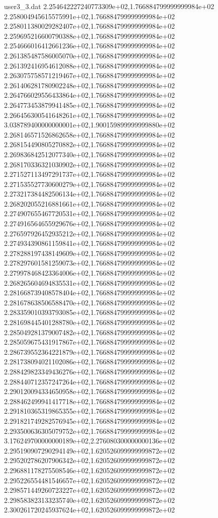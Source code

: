 \begin{filecontents}{user3_3.dat}
2.254642227240773309e+02,1.766884799999999984e+02
2.258004945615575991e+02,1.766884799999999984e+02
2.258011380029282407e+02,1.766884799999999984e+02
2.259695216600790388e+02,1.766884799999999984e+02
2.254666016412661236e+02,1.766884799999999984e+02
2.261385487586005070e+02,1.766884799999999984e+02
2.261392416954612088e+02,1.766884799999999984e+02
2.263075758571219467e+02,1.766884799999999984e+02
2.261406281780902248e+02,1.766884799999999984e+02
2.264766029556433864e+02,1.766884799999999984e+02
2.264773453879941485e+02,1.766884799999999984e+02
2.266456300541648261e+02,1.766884799999999984e+02
3.038789400000000001e+02,1.900159899999999880e+02
2.268146571526862658e+02,1.766884799999999984e+02
2.268154490805270882e+02,1.766884799999999984e+02
2.269836842512077340e+02,1.766884799999999984e+02
2.268170336321030902e+02,1.766884799999999984e+02
2.271527113497291737e+02,1.766884799999999984e+02
2.271535527730600279e+02,1.766884799999999984e+02
2.273217384482506134e+02,1.766884799999999984e+02
2.268202055216881661e+02,1.766884799999999984e+02
2.274907655467720531e+02,1.766884799999999984e+02
2.274916564655929676e+02,1.766884799999999984e+02
2.276597926452935212e+02,1.766884799999999984e+02
2.274934390861159841e+02,1.766884799999999984e+02
2.278288197438149609e+02,1.766884799999999984e+02
2.278297601581259073e+02,1.766884799999999984e+02
2.279978468423364006e+02,1.766884799999999984e+02
2.268265604694835531e+02,1.766884799999999984e+02
2.281668739408578404e+02,1.766884799999999984e+02
2.281678638506588470e+02,1.766884799999999984e+02
2.283359010393793085e+02,1.766884799999999984e+02
2.281698445401288780e+02,1.766884799999999984e+02
2.285049281379007482e+02,1.766884799999999984e+02
2.285059675431917867e+02,1.766884799999999984e+02
2.286739552364221879e+02,1.766884799999999984e+02
2.281738094021102086e+02,1.766884799999999984e+02
2.288429823349436276e+02,1.766884799999999984e+02
2.288440712357247264e+02,1.766884799999999984e+02
2.290120094334650958e+02,1.766884799999999984e+02
2.288462499941417718e+02,1.766884799999999984e+02
2.291810365319865355e+02,1.766884799999999984e+02
2.291821749282576945e+02,1.766884799999999984e+02
2.293500636305079752e+02,1.766884799999999984e+02
3.176249700000000189e+02,2.276080300000000136e+02
2.295190907290294149e+02,1.620526099999999872e+02
2.295202786207906342e+02,1.620526099999999872e+02
2.296881178275508546e+02,1.620526099999999872e+02
2.295226554481546657e+02,1.620526099999999872e+02
2.298571449260723227e+02,1.620526099999999872e+02
2.298583823133235740e+02,1.620526099999999872e+02
2.300261720245937624e+02,1.620526099999999872e+02

\end{filecontents}
